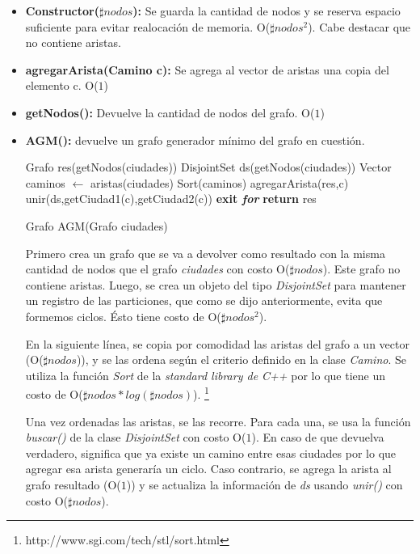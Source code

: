 \begin{itemize}
\item \textbf{Constructor($ \sharp nodos $):} Se guarda la cantidad de nodos y se reserva espacio suficiente para evitar realocaci\'on de memoria. O($ \sharp nodos^{2} $). Cabe destacar que no contiene aristas.


\item \textbf{agregarArista(Camino c):} Se agrega al vector de aristas una copia del elemento c. O($ 1 $)

\item \textbf{getNodos():} Devuelve la cantidad de nodos del grafo. O($ 1 $)

\item \textbf{AGM():} devuelve un grafo generador m\'inimo del grafo en cuesti\'on. 

\begin{algorithm}[H]
\begin{algorithmic}[1]
\STATE Grafo res(getNodos(ciudades))
\STATE DisjointSet ds(getNodos(ciudades))
\STATE Vector caminos  \quad $ \leftarrow $ \quad aristas(ciudades)
\STATE Sort(caminos)
\STATE agregarArista(res,c)
\STATE unir(ds,getCiudad1(c),getCiudad2(c))
\ENDIF
{}
\STATE \textbf{exit \textit{for}}
\ENDIF
\ENDFOR
\STATE \textbf{return} res
\end{algorithmic}
\caption{Grafo AGM(Grafo ciudades)}\label{AGM}
\end{algorithm}


\quad Primero crea un grafo que se va a devolver como resultado con la misma cantidad de nodos que el grafo \textit{ciudades} con costo O($ \sharp nodos $). Este grafo no contiene aristas. Luego, se crea un objeto del tipo \textit{DisjointSet} para mantener un registro de las particiones, que como se dijo anteriormente, evita que formemos ciclos. \'Esto tiene costo de O($\sharp nodos^{2}$).

\quad En la siguiente l\'inea, se copia por comodidad las aristas del grafo a un vector (O($\sharp nodos$)), y se las ordena según el criterio definido en la clase \textit{Camino}. Se utiliza la funci\'on \textit{Sort} de la \textit{standard library de C++} por lo que tiene un costo de O($\sharp nodos \ast log(\sharp nodos) $). \quad \footnote{http://www.sgi.com/tech/stl/sort.html}

\quad Una vez ordenadas las aristas, se las recorre. Para cada una, se usa la funci\'on \textit{buscar()} de la clase \textit{DisjointSet} con costo O($ 1 $). En caso de que devuelva verdadero, significa que ya existe un camino entre esas ciudades por lo que agregar esa arista generar\'ia un ciclo. Caso contrario, se agrega la arista al grafo resultado (O($ 1 $)) y se actualiza la informaci\'on de \textit{ds} usando \textit{unir()} con costo O($ \sharp nodos $). 


\end{itemize}
